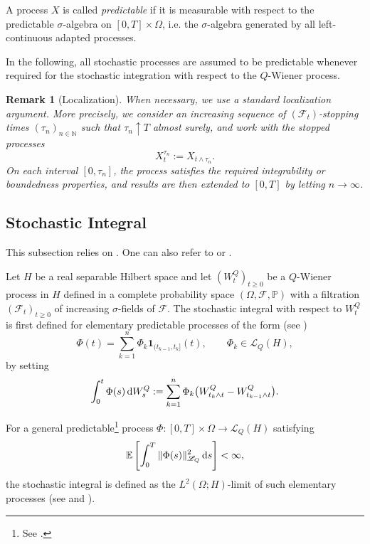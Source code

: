 \documentclass[12pt]{amsart}
\newcommand{\D}[1]{\mbox{\rm #1}}
\newcommand{\dd}{\D{d}}
\numberwithin{equation}{section}
\newtheorem{remark}[theorem]{Remark}
\begin{document}
A process $X$ is called \emph{predictable} if it is measurable with respect to the predictable $\sigma$-algebra on $[0,T]\times\Omega$, i.e. the $\sigma$-algebra generated by all left-continuous adapted processes.

In the following, all stochastic processes are assumed to be predictable whenever required for the stochastic integration with respect to the $Q$-Wiener process.


\begin{remark}[Localization]\label{rmk:local}
When necessary, we use a standard localization argument. More precisely, we consider an increasing sequence of $(\mathscr{F}_t)$-stopping times $(\tau_n)_{n\in\mathbb N}$ such that $\tau_n \uparrow T$ almost surely, and work with the stopped processes
\[
    X^{\tau_n}_t := X_{t\wedge \tau_n}.
\]
On each interval $[0,\tau_n]$, the process satisfies the required integrability or boundedness properties, and results are then extended to $[0,T]$ by letting $n\to\infty$.
\end{remark}


\subsection{Stochastic Integral}

This subsection relies on \cite[\S 6.3, page 167]{chow2007stochastic}. One can also refer to \cite[Chapter 2]{prevot2007concise} or \cite[Chapter 2]{liu2015stochastic}.

Let $H$ be a real separable Hilbert space and let $(W_t^{Q})_{t\geq 0}$ be a $Q$-Wiener process in $H$ defined in a complete probability space $(\Omega, \mathscr{F}, \mathbb{P})$ with a filtration $(\mathscr{F}_{t})_{t\geq 0}$ of increasing $\sigma$-fields of $\mathscr{F}$. 
The stochastic integral with respect to $W_t^{Q}$ is first defined for elementary predictable processes of the form (see \cite[equ.(6.17), page 168]{chow2007stochastic})
\[
    \Phi(t) = \sum_{k=1}^n \Phi_k \mathbf{1}_{(t_{k-1},t_k]}(t), \qquad \Phi_k \in \mathscr L_Q(H),
\]
by setting
\[
    \int_0^t \Phi(s)\,\dd W_s^Q := \sum_{k=1}^n \Phi_k \bigl(W_{t_k \wedge t}^Q - W_{t_{k-1} \wedge t}^Q\bigr).
\]

For a general predictable\footnote{See \cite[page 170 of \S 6.3]{chow2007stochastic}.} process  $\Phi:[0,T]\times \Omega \to \mathscr L_Q(H)$ satisfying
\[
    \mathbb{E}\left[\int_0^T \|\Phi(s)\|_{\mathscr L_Q}^2 \,\dd s\right] < \infty,
\]
the stochastic integral is defined as the $L^2(\Omega;H)$-limit of such elementary processes (see \cite[Theorem 3.4, page 171]{chow2007stochastic} and \cite[Theorem 3.6, page 173]{chow2007stochastic}).
\end{document}
